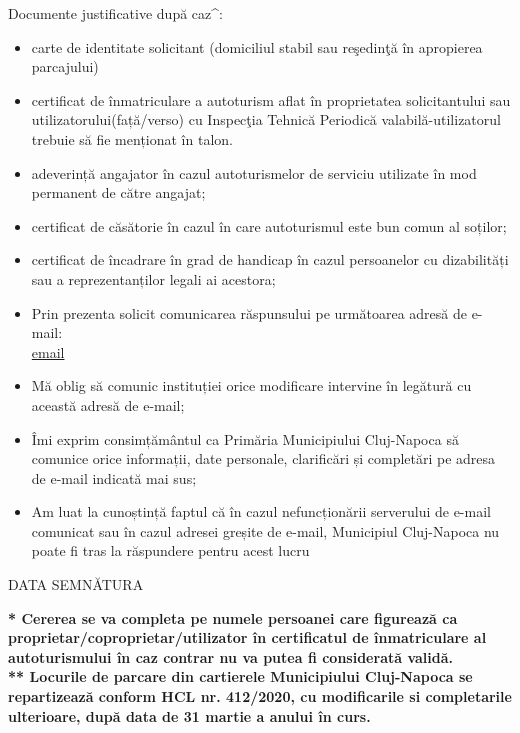 \documentclass[11pt,a4paper]{article}
\newcommand{\fillline}[1][6cm]{\underline{\hspace{#1}}}
\newcommand{\checkboxempty}{$\square$}
\begin{document}
Documente justificative după caz\textasciicircum{}:
\begin{itemize}[leftmargin=*]
\item[\checkboxempty] carte de identitate solicitant (domiciliul stabil sau reşedinţă în apropierea parcajului)
\item[\checkboxempty] certificat de înmatriculare a autoturism aflat în proprietatea solicitantului sau utilizatorului(față/verso) cu Inspecţia Tehnică Periodică valabilă-utilizatorul trebuie să fie menționat în talon.
\item[\checkboxempty] adeverință angajator în cazul autoturismelor de serviciu utilizate în mod permanent de către angajat;
\item[\checkboxempty] certificat de căsătorie în cazul în care autoturismul este bun comun al soților;
\item[\checkboxempty] certificat de încadrare în grad de handicap în cazul persoanelor cu dizabilități sau a reprezentanților legali ai acestora;
\end{itemize}

\vspace{0.3cm}

\begin{itemize}[leftmargin=*]
\item[\checkboxempty] Prin prezenta solicit comunicarea răspunsului pe următoarea adresă de e-mail:\\
\underline{ {{email}} }
\item[\checkboxempty] Mă oblig să comunic instituției orice modificare intervine în legătură cu această adresă de e-mail;
\item[\checkboxempty] Îmi exprim consimțământul ca Primăria Municipiului Cluj-Napoca să comunice orice informații, date personale, clarificări și completări pe adresa de e-mail indicată mai sus;
\item[\checkboxempty] Am luat la cunoștință faptul că în cazul nefuncționării serverului de e-mail comunicat sau în cazul adresei greșite de e-mail, Municipiul Cluj-Napoca nu poate fi tras la răspundere pentru acest lucru
\end{itemize}

\vspace{0.25cm}

DATA \fillline[3cm] \hfill SEMNĂTURA \fillline[5cm]

\vspace{0.3cm}

\textbf{* Cererea se va completa pe numele persoanei care figurează ca proprietar/coproprietar/utilizator în certificatul de înmatriculare al autoturismului în caz contrar nu va putea fi considerată validă.\\
** Locurile de parcare din cartierele Municipiului Cluj-Napoca se repartizează conform HCL nr. 412/2020, cu modificarile si completarile ulterioare, după data de 31 martie a anului în curs.}
\end{document}
